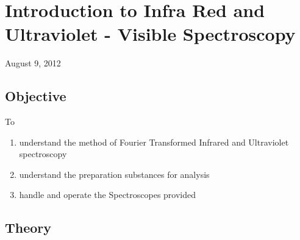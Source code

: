 \chapter{Introduction to Infra Red and Ultraviolet - Visible Spectroscopy}
\begin{flushright}
August 9, 2012
\end{flushright}
\section{Objective}
To
\begin{enumerate}
	\item understand the method of Fourier Transformed Infrared and Ultraviolet spectroscopy
	\item understand the preparation substances for analysis
	\item handle and operate the Spectroscopes provided
\end{enumerate}

\section{Theory}
